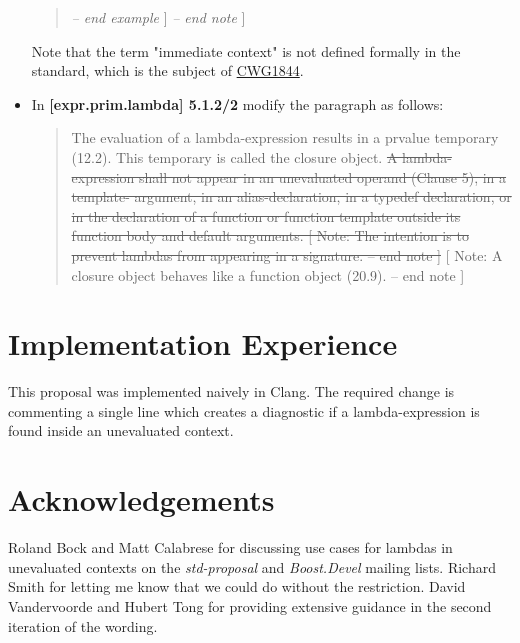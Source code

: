 \documentclass[11pt]{article}
\newcommand{\deleted}[1]{\st{#1}}
\begin{document}
\begin{itemize}
\begin{quote}
        \textit{-- end example} ]
        \textit{-- end note} ]
    \end{quote}

    Note that the term "immediate context" is not defined formally in the
    standard, which is the subject of
    \href{http://www.open-std.org/jtc1/sc22/wg21/docs/cwg_active.html#1844}{CWG1844}.

    \item In \textbf{[expr.prim.lambda] 5.1.2/2} modify the paragraph as follows:
    \begin{quote}
        The evaluation of a lambda-expression results in a prvalue temporary
        (12.2). This temporary is called the closure object. \deleted{A
        lambda-expression shall not appear in an unevaluated operand (Clause 5),
        in a template- argument, in an alias-declaration, in a typedef declaration,
        or in the declaration of a function or function template outside its function
        body and default arguments. [ Note: The intention is to prevent lambdas from
        appearing in a signature. -- end note ]} [ Note: A closure object behaves like
        a function object (20.9). -- end note ]
    \end{quote}
\end{itemize}


\section{Implementation Experience}
This proposal was implemented naively in Clang. The required change is commenting
a single line which creates a diagnostic if a lambda-expression is found inside an
unevaluated context.


\section{Acknowledgements}
Roland Bock and Matt Calabrese for discussing use cases for lambdas in unevaluated
contexts on the \textit{std-proposal} and \textit{Boost.Devel} mailing lists.
Richard Smith for letting me know that we could do without the restriction.
David Vandervoorde and Hubert Tong for providing extensive guidance in the
second iteration of the wording.
\end{document}
